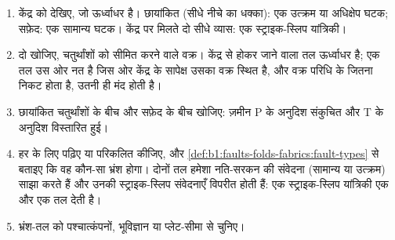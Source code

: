 \begin{method}[बीच बॉल पढ़ना]
\label{met:b1:earthquake-source:beachball}
\begin{enumerate}
  \item केंद्र को देखिए, जो ऊर्ध्वाधर है। छायांकित (सीधे नीचे का धक्का): एक उत्क्रम या अधिक्षेप घटक; सफ़ेद: एक सामान्य घटक। केंद्र पर मिलते दो सीधे व्यास: एक स्ट्राइक-स्लिप यांत्रिकी।
  \item दो  खोजिए, चतुर्थांशों को सीमित करने वाले वक्र। केंद्र से होकर जाने वाला तल ऊर्ध्वाधर है; एक तल उस ओर नत है जिस ओर केंद्र के सापेक्ष उसका वक्र स्थित है, और वक्र परिधि के जितना निकट होता है,  उतनी ही मंद होती है।
  \item छायांकित चतुर्थांशों के बीच  और सफ़ेद के बीच  खोजिए: ज़मीन P के अनुदिश संकुचित और T के अनुदिश विस्तारित हुई।
  \item हर  के लिए  पढ़िए या परिकलित कीजिए, और \cref{def:b1:faults-folds-fabrics:fault-types} से बताइए कि वह कौन-सा भ्रंश होगा। दोनों तल हमेशा नति-सरकन की संवेदना (सामान्य या उत्क्रम) साझा करते हैं और उनकी स्ट्राइक-स्लिप संवेदनाएँ विपरीत होती हैं: एक स्ट्राइक-स्लिप यांत्रिकी एक  और एक  तल देती है।
  \item भ्रंश-तल को पश्चात्कंपनों, भूविज्ञान या प्लेट-सीमा से चुनिए।
\end{enumerate}
\end{method}

